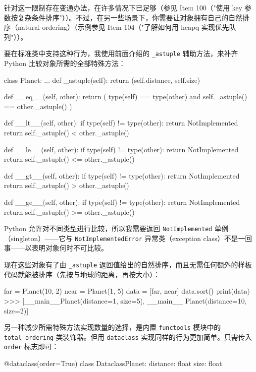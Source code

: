 针对这一限制存在变通办法，在许多情况下已足够（参见 Item 100（"使用 key 参数按复杂条件排序"））。不过，在另一些场景下，你需要让对象拥有自己的自然排序（natural ordering）（示例参见 Item 104（"了解如何用 heapq 实现优先队列"））。

要在标准类中支持这种行为，我使用前面介绍的 \texttt{\_astuple} 辅助方法，来补齐 Python 比较对象所需的全部特殊方法：

\begin{codebox}[python]
class Planet:
    ...
    def _astuple(self):
        return (self.distance, self.size)

    def __eq__(self, other):
        return (
            type(self) == type(other)
            and self._astuple() == other._astuple()
        )

    def __lt__(self, other):
        if type(self) != type(other):
            return NotImplemented
        return self._astuple() < other._astuple()

    def __le__(self, other):
        if type(self) != type(other):
            return NotImplemented
        return self._astuple() <= other._astuple()

    def __gt__(self, other):
        if type(self) != type(other):
            return NotImplemented
        return self._astuple() > other._astuple()

    def __ge__(self, other):
        if type(self) != type(other):
            return NotImplemented
        return self._astuple() >= other._astuple()
\end{codebox}

Python 允许对不同类型进行比较，所以我需要返回 \texttt{NotImplemented} 单例（singleton）——它与 \texttt{NotImplementedError} 异常类（exception class）不是一回事——以表明对象何时不可比较。

现在这些对象有了由 \texttt{\_astuple} 返回值给出的自然排序，而且无需任何额外的样板代码就能被排序（先按与地球的距离，再按大小）：

\begin{codebox}[python]
far = Planet(10, 2)
near = Planet(1, 5)
data = [far, near]
data.sort()
print(data)
>>>
[__main__Planet(distance=1, size=5), __main__
Planet(distance=10, size=2)]
\end{codebox}

另一种减少所需特殊方法实现数量的选择，是内置 \texttt{functools} 模块中的 \texttt{total\_ordering} 类装饰器。但用 \texttt{dataclass} 实现同样的行为更加简单。只需传入 \texttt{order} 标志即可：

\begin{codebox}[python]
@dataclass(order=True)
class DataclassPlanet:
    distance: float
    size: float
\end{codebox}

